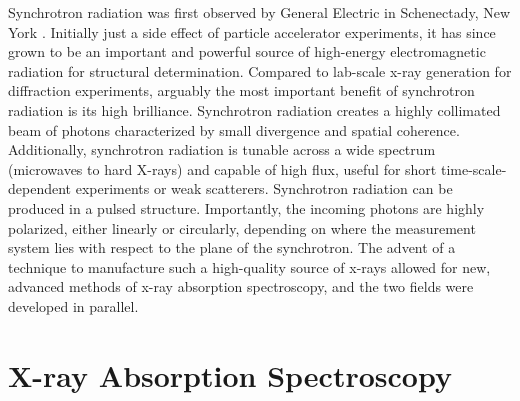 

Synchrotron radiation was first observed by General Electric in Schenectady, New York \cite{firstSynchrotronRadPaper}. Initially just a side effect of particle accelerator experiments, it has since grown to be an important and powerful source of high-energy electromagnetic radiation for structural determination. Compared to lab-scale x-ray generation for diffraction experiments, arguably the most important benefit of synchrotron radiation is its high brilliance. Synchrotron radiation creates a highly collimated beam of photons characterized by small divergence and spatial coherence. Additionally, synchrotron radiation is tunable across a wide spectrum (microwaves to hard X-rays) and capable of high flux, useful for short time-scale-dependent experiments or weak scatterers. Synchrotron radiation can be produced in a pulsed structure. Importantly, the incoming photons are highly polarized, either linearly or circularly, depending on where the measurement system lies with respect to the plane of the synchrotron. The advent of a technique to manufacture such a high-quality source of x-rays allowed for new, advanced methods of x-ray absorption spectroscopy, and the two fields were developed in parallel.

\section{X-ray Absorption Spectroscopy}

